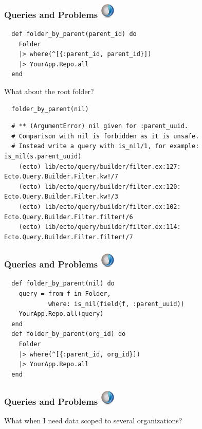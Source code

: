 \documentclass{beamer}
\begin{document}
\begin{frame}[fragile]
\frametitle{Queries and Problems \hfill \includegraphics[width=0.05\textwidth]{recogizer_logo_small.png}}
\begin{verbatim}
  def folder_by_parent(parent_id) do
    Folder
    |> where(^[{:parent_id, parent_id}])
    |> YourApp.Repo.all
  end
\end{verbatim}
\pause
\centerline{What about the root folder?}
\pause
\begin{verbatim}
  folder_by_parent(nil)
\end{verbatim}
\begin{tiny}
\begin{verbatim}
  # ** (ArgumentError) nil given for :parent_uuid.
  # Comparison with nil is forbidden as it is unsafe.
  # Instead write a query with is_nil/1, for example: is_nil(s.parent_uuid)
    (ecto) lib/ecto/query/builder/filter.ex:127: Ecto.Query.Builder.Filter.kw!/7
    (ecto) lib/ecto/query/builder/filter.ex:120: Ecto.Query.Builder.Filter.kw!/3
    (ecto) lib/ecto/query/builder/filter.ex:102: Ecto.Query.Builder.Filter.filter!/6
    (ecto) lib/ecto/query/builder/filter.ex:114: Ecto.Query.Builder.Filter.filter!/7

\end{verbatim}
\end{tiny}
\end{frame}


\begin{frame}[fragile]
\frametitle{Queries and Problems \hfill \includegraphics[width=0.05\textwidth]{recogizer_logo_small.png}}
\begin{verbatim}
  def folder_by_parent(nil) do
    query = from f in Folder,
            where: is_nil(field(f, :parent_uuid))
    YourApp.Repo.all(query)
  end
  def folder_by_parent(org_id) do
    Folder
    |> where(^[{:parent_id, org_id}])
    |> YourApp.Repo.all
  end
\end{verbatim}
\end{frame}


\begin{frame}[fragile]
\frametitle{Queries and Problems \hfill \includegraphics[width=0.05\textwidth]{recogizer_logo_small.png}}
\centerline{What when I need data scoped to several organizations?}
\end{frame}
\end{document}
